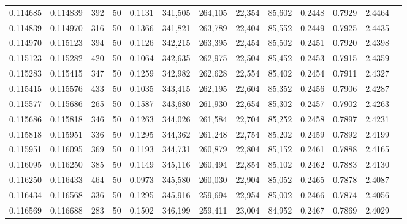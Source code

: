 \begin{tabular}{rrrrrrrrrrrrr}
0.114685 & 0.114839 &   392 &  50 &                                     0.1131 & 341,505 & 264,105 &  22,354 &  85,602 & 0.2448 & 0.7929 & 2.4464 \\
0.114839 & 0.114970 &   316 &  50 &                                     0.1366 & 341,821 & 263,789 &  22,404 &  85,552 & 0.2449 & 0.7925 & 2.4435 \\
0.114970 & 0.115123 &   394 &  50 &                                     0.1126 & 342,215 & 263,395 &  22,454 &  85,502 & 0.2451 & 0.7920 & 2.4398 \\
0.115123 & 0.115282 &   420 &  50 &                                     0.1064 & 342,635 & 262,975 &  22,504 &  85,452 & 0.2453 & 0.7915 & 2.4359 \\
0.115283 & 0.115415 &   347 &  50 &                                     0.1259 & 342,982 & 262,628 &  22,554 &  85,402 & 0.2454 & 0.7911 & 2.4327 \\
0.115415 & 0.115576 &   433 &  50 &                                     0.1035 & 343,415 & 262,195 &  22,604 &  85,352 & 0.2456 & 0.7906 & 2.4287 \\
0.115577 & 0.115686 &   265 &  50 &                                     0.1587 & 343,680 & 261,930 &  22,654 &  85,302 & 0.2457 & 0.7902 & 2.4263 \\
0.115686 & 0.115818 &   346 &  50 &                                     0.1263 & 344,026 & 261,584 &  22,704 &  85,252 & 0.2458 & 0.7897 & 2.4231 \\
0.115818 & 0.115951 &   336 &  50 &                                     0.1295 & 344,362 & 261,248 &  22,754 &  85,202 & 0.2459 & 0.7892 & 2.4199 \\
0.115951 & 0.116095 &   369 &  50 &                                     0.1193 & 344,731 & 260,879 &  22,804 &  85,152 & 0.2461 & 0.7888 & 2.4165 \\
0.116095 & 0.116250 &   385 &  50 &                                     0.1149 & 345,116 & 260,494 &  22,854 &  85,102 & 0.2462 & 0.7883 & 2.4130 \\
0.116250 & 0.116433 &   464 &  50 &                                     0.0973 & 345,580 & 260,030 &  22,904 &  85,052 & 0.2465 & 0.7878 & 2.4087 \\
0.116434 & 0.116568 &   336 &  50 &                                     0.1295 & 345,916 & 259,694 &  22,954 &  85,002 & 0.2466 & 0.7874 & 2.4056 \\
0.116569 & 0.116688 &   283 &  50 &                                     0.1502 & 346,199 & 259,411 &  23,004 &  84,952 & 0.2467 & 0.7869 & 2.4029 \\

\end{tabular}
